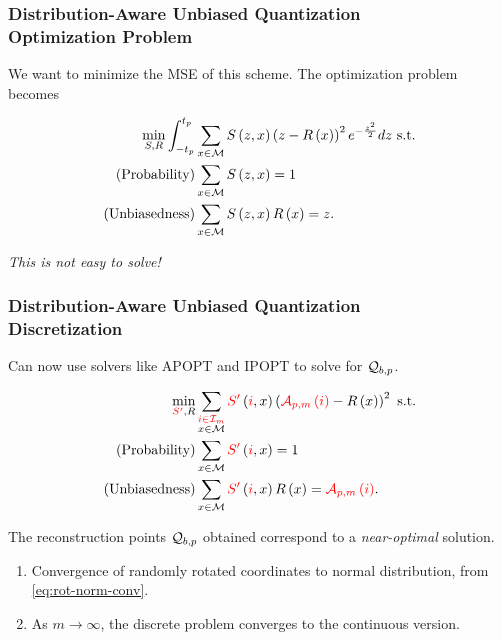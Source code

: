 \documentclass{beamer}
\begin{document}
    \begin{frame}
        \frametitle{Distribution-Aware Unbiased Quantization\\\small Optimization Problem}
        We want to minimize the MSE of this scheme. The optimization problem
        becomes

        \begin{align}
            \min_{S,R} \int_{-t_p}^{t_p} &\sum_{x\in\cM}S\brak{z,x}\brak{z-R\brak{x}}^2e^{-\frac{z^2}{2}}dz\ \text{s.t.} \\
            \text{(Probability)} &\sum_{x\in\cM}S\brak{z,x} = 1 \\
            \text{(Unbiasedness)} &\sum_{x\in\cM}S\brak{z,x}R\brak{x} = z.
            \label{eq:opt-prob-dauq}
        \end{align}

        \emph{This is not easy to solve!}
    \end{frame}

    \begin{frame}
        \frametitle{Distribution-Aware Unbiased Quantization\\\small Discretization}
        Can now use solvers like APOPT and IPOPT to solve for \(\mathcal Q_{b,p}\). 

        \begin{align}
            \min_{\textcolor{red}{S^\prime},R} &\sum_{\substack{\textcolor{red}{i\in\mathcal I_m}\\x\in\mathcal M}}\textcolor{red}{S^\prime}\left(\textcolor{red}{i},x\right)\left(\textcolor{red}{\mathcal A_{p,m}\left(i\right)}-R\left(x\right)\right)^2 \text{ s.t.} \\
            \text{(Probability)} &\sum_{x\in\mathcal M}\textcolor{red}{S^\prime}\left(\textcolor{red}{i},x\right) = 1 \\
            \text{(Unbiasedness)} &\sum_{x\in\mathcal M}\textcolor{red}{S^\prime}\left(\textcolor{red}{i},x\right)R\left(x\right) = \textcolor{red}{\mathcal A_{p,m}\left(i\right)}.
            \label{eq:opt-prob-dauq-disc}
        \end{align}

        The reconstruction points \(\mathcal Q_{b,p}\) obtained correspond to a
        \emph{near-optimal} solution.
        \begin{enumerate}
            \item Convergence of randomly rotated coordinates to normal
            distribution, from \eqref{eq:rot-norm-conv}.
            \item As \(m\to\infty\), the discrete problem converges to the
            continuous version.
        \end{enumerate}
    \end{frame}
\end{document}
